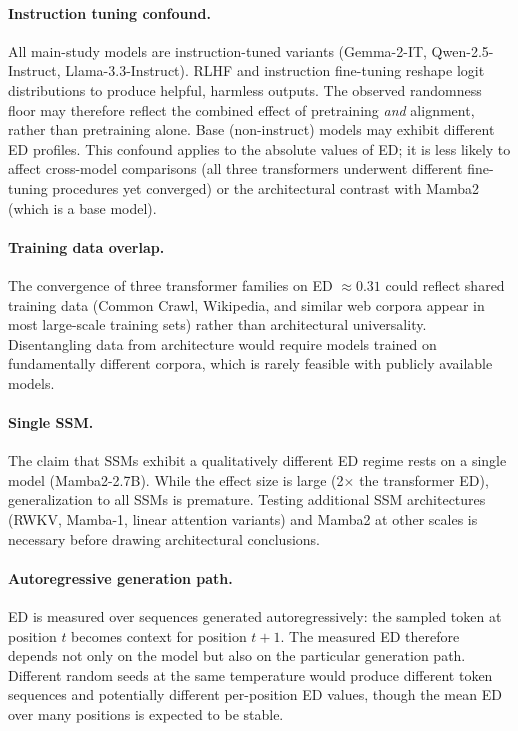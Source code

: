 \documentclass{article}
\begin{document}
\paragraph{Instruction tuning confound.}
All main-study models are instruction-tuned variants (Gemma-2-IT, Qwen-2.5-Instruct, Llama-3.3-Instruct). RLHF and instruction fine-tuning reshape logit distributions to produce helpful, harmless outputs. The observed randomness floor may therefore reflect the combined effect of pretraining \emph{and} alignment, rather than pretraining alone. Base (non-instruct) models may exhibit different ED profiles. This confound applies to the absolute values of ED; it is less likely to affect cross-model comparisons (all three transformers underwent different fine-tuning procedures yet converged) or the architectural contrast with Mamba2 (which is a base model).

\paragraph{Training data overlap.}
The convergence of three transformer families on ED $\approx 0.31$ could reflect shared training data (Common Crawl, Wikipedia, and similar web corpora appear in most large-scale training sets) rather than architectural universality. Disentangling data from architecture would require models trained on fundamentally different corpora, which is rarely feasible with publicly available models.

\paragraph{Single SSM.}
The claim that SSMs exhibit a qualitatively different ED regime rests on a single model (Mamba2-2.7B). While the effect size is large (2$\times$ the transformer ED), generalization to all SSMs is premature. Testing additional SSM architectures (RWKV, Mamba-1, linear attention variants) and Mamba2 at other scales is necessary before drawing architectural conclusions.

\paragraph{Autoregressive generation path.}
ED is measured over sequences generated autoregressively: the sampled token at position $t$ becomes context for position $t+1$. The measured ED therefore depends not only on the model but also on the particular generation path. Different random seeds at the same temperature would produce different token sequences and potentially different per-position ED values, though the mean ED over many positions is expected to be stable.
\end{document}
